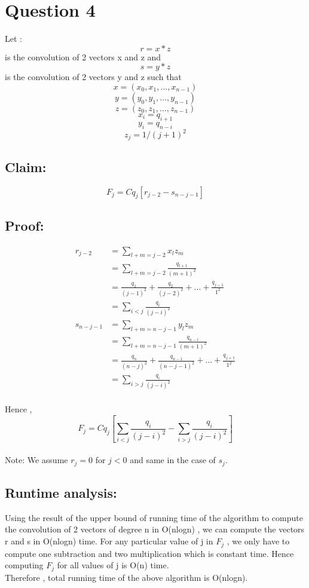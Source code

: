 \documentclass[11pt]{article}
\begin{document}
\section*{Question 4}
Let : 
\[r = x * z \] is the convolution of 2 vectors x and z and \\
\[s = y * z \] is the convolution of 2 vectors y and z such that
\[x = (x_{0},x_{1},...,x_{n-1})\]
\[y = (y_{0},y_{1},...,y_{n-1})\]
\[z = (z_{0},z_{1},...,z_{n-1})\]
\[x_{i} = q_{i+1}\]
\[y_{i} = q_{n-i}\]
\[z_{j} = 1/(j+1)^2\]

\subsection*{Claim:} \[F_j = Cq_j[r_{j-2} - s_{n-j-1}]\]

\subsection*{Proof:}
\begin{align*}
r_{j-2} & = \sum_{l+m=j-2} x_lz_m \\
&= \sum_{l+m=j-2} \frac{q_{l+1}}{(m+1)^2} \\
&= \frac{q_1}{(j-1)^2} + \frac{q_2}{(j-2)^2} + ... + \frac{q_{j-1}}{1^2} \\
&= \sum_{i<j} \frac{q_i}{(j-i)^2} \\
s_{n-j-1} & = \sum_{l+m=n-j-1} y_lz_m \\
&= \sum_{l+m=n-j-1} \frac{q_{n-l}}{(m+1)^2} \\
&= \frac{q_n}{(n-j)^2} + \frac{q_{n-1}}{(n-j-1)^2} + ... + \frac{q_{j+1}}{1^2} \\
&= \sum_{i>j} \frac{q_i}{(j-i)^2} \\ 
\end{align*}

Hence , 
\[F_j = Cq_j[\sum_{i<j} \frac{q_{i}}{(j-i)^2} - \sum_{i>j} \frac{q_{i}}{(j-i)^2}  ]\] 
\\
Note: We assume $r_j = 0$ for $j < 0$ and same in the case of $s_j$.

\subsection*{Runtime analysis:}
Using the result of the upper bound of running time of the algorithm to compute the convolution of 2 vectors of degree n in O(nlogn) , we can compute the vectors r and s in O(nlogn) time.
For any particular value of j in $F_j$ , we only have to compute one subtraction and two multiplication which is constant time. Hence computing $F_j$ for all values of j is O(n) time. \\
Therefore , total running time of the above algorithm is O(nlogn).
\end{document}
